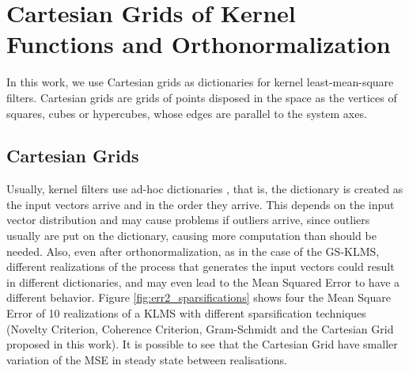 \chapter{Cartesian Grids of Kernel Functions and Orthonormalization}\label{sec:grids}

In this work, we use Cartesian grids as dictionaries for kernel least-mean-square filters. Cartesian grids are grids of points disposed in the space as the vertices of squares, cubes or hypercubes, whose edges are parallel to the system axes. 

\section{Cartesian Grids}

Usually, kernel filters use ad-hoc dictionaries \cite{engel_kernel_2004,richard_online_2009,platt_resource-allocating_1991,badong_chen_quantized_2012,bueno_gram-schmidt-based_2020}, that is, the dictionary is created as the input vectors arrive and in the order they arrive. This depends on the input vector distribution and may cause problems if outliers arrive, since outliers usually are put on the dictionary, causing more computation than should be needed. Also, even after orthonormalization, as in the case of the GS-KLMS, different realizations of the process that generates the input vectors could result in different dictionaries, and may even lead to the Mean Squared Error to have a different behavior. 
Figure \ref{fig:err2_sparsifications} shows four the Mean Square Error of 10 realizations of a KLMS with different sparsification techniques (Novelty Criterion, Coherence Criterion, Gram-Schmidt and the Cartesian Grid proposed in this work). It is possible to see that the Cartesian Grid have smaller variation of the MSE in steady state between realisations.
